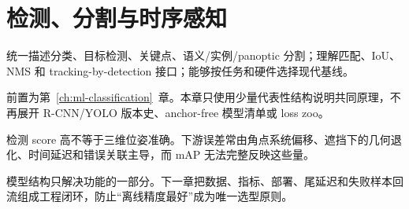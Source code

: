 \chapter{检测、分割与时序感知}
\label{ch:semantic-perception}

\begin{learningobjectives}
统一描述分类、目标检测、关键点、语义/实例/panoptic 分割；理解匹配、IoU、NMS 和 tracking-by-detection 接口；能够按任务和硬件选择现代基线。
\end{learningobjectives}

\begin{prerequisites}
前置为第~\ref{ch:ml-classification}~章。本章只使用少量代表性结构说明共同原理，不再展开 R-CNN/YOLO 版本史、anchor-free 模型清单或 loss zoo。
\end{prerequisites}


\begin{failuremode}
检测 score 高不等于三维位姿准确。下游误差常由角点系统偏移、遮挡下的几何退化、时间延迟和错误关联主导，而 mAP 无法完整反映这些量。
\end{failuremode}

\begin{chaptertransition}
模型结构只解决功能的一部分。下一章把数据、指标、部署、尾延迟和失败样本回流组成工程闭环，防止“离线精度最好”成为唯一选型原则。
\end{chaptertransition}

